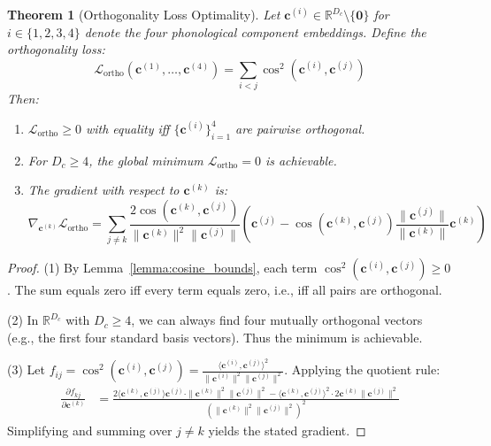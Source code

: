 \documentclass[sigconf,nonacm,anonymous]{acmart}
\newtheorem{theorem}{Theorem}[section]
\theoremstyle{definition}
\theoremstyle{remark}
\begin{document}
\begin{theorem}[Orthogonality Loss Optimality]
\label{thm:ortho}
Let $\mathbf{c}^{(i)} \in \mathbb{R}^{D_c} \setminus \{\mathbf{0}\}$ for $i \in \{1,2,3,4\}$ denote the four phonological component embeddings. Define the orthogonality loss:
\begin{equation}
\mathcal{L}_{\text{ortho}}(\mathbf{c}^{(1)}, \ldots, \mathbf{c}^{(4)}) = \sum_{i < j} \cos^2(\mathbf{c}^{(i)}, \mathbf{c}^{(j)})
\end{equation}
Then:
\begin{enumerate}[nosep]
\item $\mathcal{L}_{\text{ortho}} \geq 0$ with equality iff $\{\mathbf{c}^{(i)}\}_{i=1}^4$ are pairwise orthogonal.
\item For $D_c \geq 4$, the global minimum $\mathcal{L}_{\text{ortho}} = 0$ is achievable.
\item The gradient with respect to $\mathbf{c}^{(k)}$ is:
\begin{equation}
\nabla_{\mathbf{c}^{(k)}} \mathcal{L}_{\text{ortho}} = \sum_{j \neq k} \frac{2 \cos(\mathbf{c}^{(k)}, \mathbf{c}^{(j)})}{\|\mathbf{c}^{(k)}\|^2 \|\mathbf{c}^{(j)}\|} \left( \mathbf{c}^{(j)} - \cos(\mathbf{c}^{(k)}, \mathbf{c}^{(j)}) \frac{\|\mathbf{c}^{(j)}\|}{\|\mathbf{c}^{(k)}\|} \mathbf{c}^{(k)} \right)
\end{equation}
\end{enumerate}
\end{theorem}

\begin{proof}
(1) By Lemma~\ref{lemma:cosine_bounds}, each term $\cos^2(\mathbf{c}^{(i)}, \mathbf{c}^{(j)}) \geq 0$. The sum equals zero iff every term equals zero, i.e., iff all pairs are orthogonal.

(2) In $\mathbb{R}^{D_c}$ with $D_c \geq 4$, we can always find four mutually orthogonal vectors (e.g., the first four standard basis vectors). Thus the minimum is achievable.

(3) Let $f_{ij} = \cos^2(\mathbf{c}^{(i)}, \mathbf{c}^{(j)}) = \frac{\langle \mathbf{c}^{(i)}, \mathbf{c}^{(j)} \rangle^2}{\|\mathbf{c}^{(i)}\|^2 \|\mathbf{c}^{(j)}\|^2}$. Applying the quotient rule:
\begin{align}
\frac{\partial f_{kj}}{\partial \mathbf{c}^{(k)}} &= \frac{2\langle \mathbf{c}^{(k)}, \mathbf{c}^{(j)} \rangle \mathbf{c}^{(j)} \cdot \|\mathbf{c}^{(k)}\|^2 \|\mathbf{c}^{(j)}\|^2 - \langle \mathbf{c}^{(k)}, \mathbf{c}^{(j)} \rangle^2 \cdot 2\mathbf{c}^{(k)} \|\mathbf{c}^{(j)}\|^2}{(\|\mathbf{c}^{(k)}\|^2 \|\mathbf{c}^{(j)}\|^2)^2}
\end{align}
Simplifying and summing over $j \neq k$ yields the stated gradient.
\end{proof}
\end{document}
